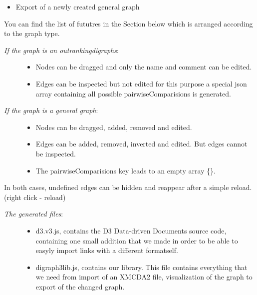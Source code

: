 \documentclass[letterpaper,10pt,english]{sphinxmanual}
\begin{document}
\begin{fulllineitems}
\begin{fulllineitems}
\begin{description}
\begin{itemize}
\item {} 
Export of a newly created general graph

\end{itemize}

\end{description}

You can find the list of fututres in the Section below which is arranged according to the graph type.
\begin{description}
\item[{\emph{If the graph is an outrankingdigraphs}:}] \leavevmode\begin{itemize}
\item {} 
Nodes can be dragged and only the name and comment can be edited.

\item {} 
Edges can be inspected but not edited for this purpose a special json array containing all possible pairwiseComparisions is generated.

\end{itemize}

\item[{\emph{If the graph is a general graph}:}] \leavevmode\begin{itemize}
\item {} 
Nodes can be dragged, added, removed and edited.

\item {} 
Edges can be added, removed, inverted and edited. But edges cannot be inspected.

\item {} 
The pairwiseComparisions key leads to an empty array \{\}.

\end{itemize}

\end{description}

In both cases, undefined edges can be hidden and reappear after a simple reload.(right click - reload)
\begin{description}
\item[{\emph{The generated files}:}] \leavevmode\begin{itemize}
\item {} 
d3.v3.js, contains the D3 Data-driven Documents source code, containing one small addition that we made in order to be able to easyly import links with a different formatself.

\item {} 
digraph3lib.js, contains our library. This file contains everything that we need from import of an XMCDA2 file, visualization of the graph to export of the changed graph.


\end{itemize}
\end{description}
\end{fulllineitems}
\end{fulllineitems}
\end{document}
